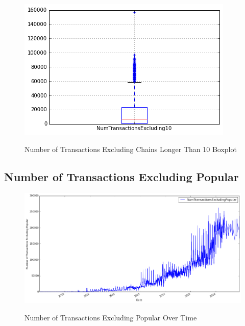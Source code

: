 \begin{figure}[bth]
  \myfloatalign
  {\includegraphics[width=1\linewidth]
    {gfx/n-transactions-excluding-chains-longer-than-10-boxplot}}
  \caption{Number of Transactions Excluding Chains Longer Than 10
    Boxplot}
  \label{fig:n-transactions-excluding-chains-longer-than-10-boxplot}
\end{figure}

\clearpage

\subsection{Number of Transactions Excluding Popular}
\label{sec:n-transactions-excluding-popular}

\begin{figure}[bth]
  \myfloatalign
  {\includegraphics[width=1\linewidth]
    {gfx/n-transactions-excluding-popular-over-time}}
  \caption{Number of Transactions Excluding Popular
    Over Time}
  \label{fig:n-transactions-excluding-popular-over-time}
\end{figure}

